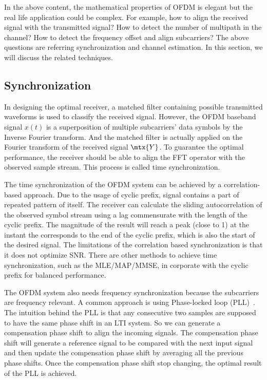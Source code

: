 In the above content, the mathematical properties of OFDM is elegant but the real life application could be complex. For example, how to align the received signal with the transmitted signal? How to detect the number of multipath in the channel? How to detect the frequency offset and align subcarriers? The above questions are referring synchronization and channel estimation. In this section, we will discuss the related techniques.

\subsection{Synchronization}
In designing the optimal receiver, a matched filter containing possible transmitted waveforms is used to classify the received signal. However, the OFDM baseband signal $x(t)$ is a superposition of multiple subcarriers' data symbols by the Inverse Fourier transform. And the matched filter is actually applied on the Fourier transform of the received signal $\mtx{Y}$. To guarantee the optimal performance, the receiver should be able to align the FFT operator with the observed sample stream. This process is called time synchronization.

The time synchronization of the OFDM system can be achieved by a correlation-based approach. Due to the usage of cyclic prefix, signal contains a part of repeated pattern of itself. The receiver can calculate the sliding autocorrelation of the observed symbol stream using a lag commensurate with the length of the cyclic prefix. The magnitude of the result will reach a peak (close to 1) at the instant the corresponds to the end of the cyclic prefix, which is also the start of the desired signal. The limitations of the correlation based synchronization is that it does not optimize SNR. There are other methods to achieve time synchronization, such as the MLE/MAP/MMSE, \etc in corporate with the cyclic prefix for balanced performance.


The OFDM system also needs frequency synchronization because the subcarriers are frequency relevant. A common approach is using Phase-locked loop (PLL)~\cite{ContributorstoWikimediaprojects2024Mar}. The intuition behind the PLL is that any consecutive two samples are supposed to have the same phase shift in an LTI system. So we can generate a compensation phase shift to align the incoming signals. The compensation phase shift will generate a reference signal to be compared with the next input signal and then update the compensation phase shift by averaging all the previous phase shifts. Once the compensation phase shift stop changing, the optimal result of the PLL is achieved.

